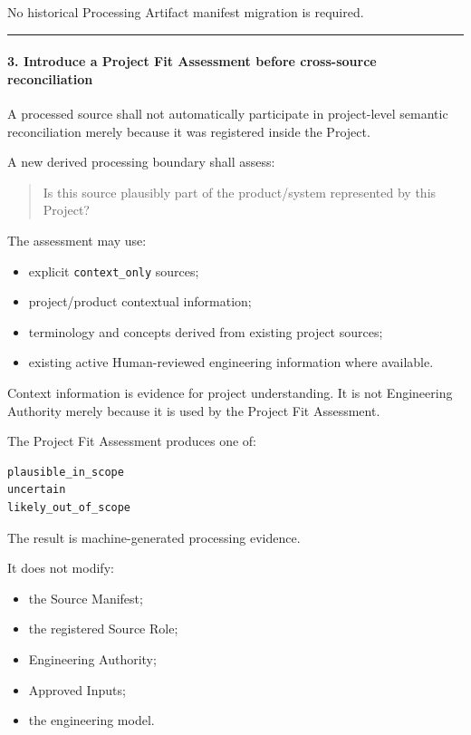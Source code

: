 No historical Processing Artifact manifest migration is required.

\begin{center}\rule{0.5\linewidth}{0.5pt}\end{center}

\hypertarget{3-introduce-a-project-fit-assessment-before-cross-source-reconciliation}{%
\paragraph{3. Introduce a Project Fit Assessment before cross-source reconciliation}\label{3-introduce-a-project-fit-assessment-before-cross-source-reconciliation}}

A processed source shall not automatically participate in project-level semantic reconciliation merely because it was registered inside the Project.

A new derived processing boundary shall assess:

\begin{quote}
Is this source plausibly part of the product/system represented by this Project?
\end{quote}

The assessment may use:

\begin{itemize}
\tightlist
\item
  explicit \texttt{context\_only} sources;
\item
  project/product contextual information;
\item
  terminology and concepts derived from existing project sources;
\item
  existing active Human-reviewed engineering information where available.
\end{itemize}

Context information is evidence for project understanding. It is not Engineering Authority merely because it is used by the Project Fit Assessment.

The Project Fit Assessment produces one of:

\begin{verbatim}
plausible_in_scope
uncertain
likely_out_of_scope
\end{verbatim}

The result is machine-generated processing evidence.

It does not modify:

\begin{itemize}
\tightlist
\item
  the Source Manifest;
\item
  the registered Source Role;
\item
  Engineering Authority;
\item
  Approved Inputs;
\item
  the engineering model.
\end{itemize}

